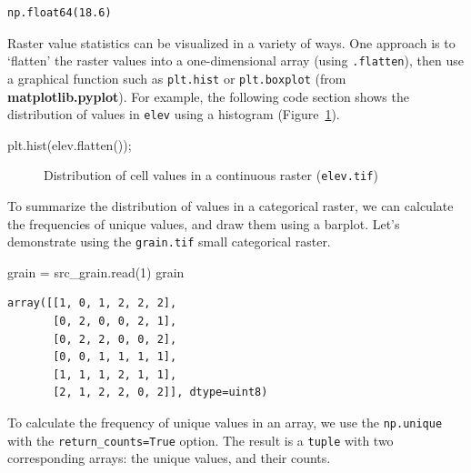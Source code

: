 \documentclass[
  letterpaper,
]{krantz}
\newenvironment{Shaded}{\begin{snugshade}}{\end{snugshade}}
\newcommand{\DecValTok}[1]{\textcolor[rgb]{0.68,0.00,0.00}{#1}}
\newcommand{\NormalTok}[1]{\textcolor[rgb]{0.00,0.23,0.31}{#1}}
\newcommand{\OperatorTok}[1]{\textcolor[rgb]{0.37,0.37,0.37}{#1}}
\begin{document}
\begin{verbatim}
np.float64(18.6)
\end{verbatim}

Raster value statistics can be visualized in a variety of ways. One
approach is to `flatten' the raster values into a one-dimensional array
(using \texttt{.flatten}), then use a graphical function such as
\texttt{plt.hist} or \texttt{plt.boxplot} (from
\textbf{matplotlib.pyplot}). For example, the following code section
shows the distribution of values in \texttt{elev} using a histogram
(Figure~\ref{fig-raster-hist}).

\begin{Shaded}
\begin{Highlighting}[]
\NormalTok{plt.hist(elev.flatten())}\OperatorTok{;}
\end{Highlighting}
\end{Shaded}

\begin{figure}[H]


\caption{\label{fig-raster-hist}Distribution of cell values in a
continuous raster (\texttt{elev.tif})}

\end{figure}%

To summarize the distribution of values in a categorical raster, we can
calculate the frequencies of unique values, and draw them using a
barplot. Let's demonstrate using the \texttt{grain.tif} small
categorical raster.

\begin{Shaded}
\begin{Highlighting}[]
\NormalTok{grain }\OperatorTok{=}\NormalTok{ src\_grain.read(}\DecValTok{1}\NormalTok{)}
\NormalTok{grain}
\end{Highlighting}
\end{Shaded}

\begin{verbatim}
array([[1, 0, 1, 2, 2, 2],
       [0, 2, 0, 0, 2, 1],
       [0, 2, 2, 0, 0, 2],
       [0, 0, 1, 1, 1, 1],
       [1, 1, 1, 2, 1, 1],
       [2, 1, 2, 2, 0, 2]], dtype=uint8)
\end{verbatim}

To calculate the frequency of unique values in an array, we use the
\texttt{np.unique} with the \texttt{return\_counts=True} option. The
result is a \texttt{tuple} with two corresponding arrays: the unique
values, and their counts.
\end{document}
